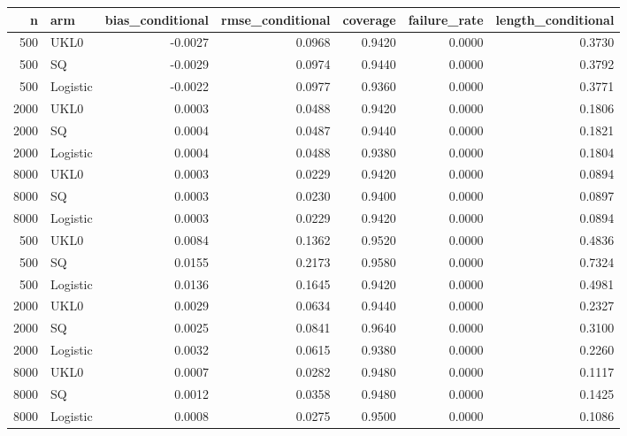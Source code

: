 \begin{tabular}{rlrrrrr}
\toprule
n & arm & bias\_conditional & rmse\_conditional & coverage & failure\_rate & length\_conditional \\
\midrule
500 & UKL0 & -0.0027 & 0.0968 & 0.9420 & 0.0000 & 0.3730 \\
500 & SQ & -0.0029 & 0.0974 & 0.9440 & 0.0000 & 0.3792 \\
500 & Logistic & -0.0022 & 0.0977 & 0.9360 & 0.0000 & 0.3771 \\
2000 & UKL0 & 0.0003 & 0.0488 & 0.9420 & 0.0000 & 0.1806 \\
2000 & SQ & 0.0004 & 0.0487 & 0.9440 & 0.0000 & 0.1821 \\
2000 & Logistic & 0.0004 & 0.0488 & 0.9380 & 0.0000 & 0.1804 \\
8000 & UKL0 & 0.0003 & 0.0229 & 0.9420 & 0.0000 & 0.0894 \\
8000 & SQ & 0.0003 & 0.0230 & 0.9400 & 0.0000 & 0.0897 \\
8000 & Logistic & 0.0003 & 0.0229 & 0.9420 & 0.0000 & 0.0894 \\
500 & UKL0 & 0.0084 & 0.1362 & 0.9520 & 0.0000 & 0.4836 \\
500 & SQ & 0.0155 & 0.2173 & 0.9580 & 0.0000 & 0.7324 \\
500 & Logistic & 0.0136 & 0.1645 & 0.9420 & 0.0000 & 0.4981 \\
2000 & UKL0 & 0.0029 & 0.0634 & 0.9440 & 0.0000 & 0.2327 \\
2000 & SQ & 0.0025 & 0.0841 & 0.9640 & 0.0000 & 0.3100 \\
2000 & Logistic & 0.0032 & 0.0615 & 0.9380 & 0.0000 & 0.2260 \\
8000 & UKL0 & 0.0007 & 0.0282 & 0.9480 & 0.0000 & 0.1117 \\
8000 & SQ & 0.0012 & 0.0358 & 0.9480 & 0.0000 & 0.1425 \\
8000 & Logistic & 0.0008 & 0.0275 & 0.9500 & 0.0000 & 0.1086 \\
\bottomrule
\end{tabular}
